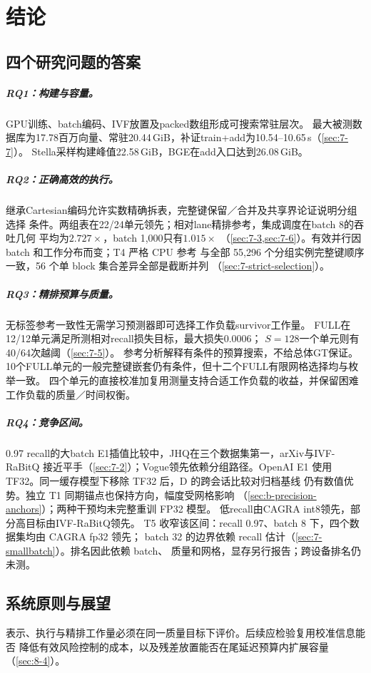\chapter{结论}
\label{ch:conclusion}

\section{四个研究问题的答案}
\label{sec:9-1}
\paragraph{RQ1：构建与容量。}
GPU训练、batch编码、IVF放置及packed数组形成可搜索常驻层次。
最大被测数据库为17.78百万向量、常驻20.44\,GiB，补证train+add为10.54--10.65\,s（\cref{sec:7-7}）。
Stella采样构建峰值22.58\,GiB，BGE在add入口达到26.08\,GiB。

\paragraph{RQ2：正确高效的执行。}
继承Cartesian编码允许实数精确拆表，完整键保留／合并及共享界论证说明分组选择
条件。两组表在22/24单元领先；相对lane精排参考，集成调度在batch 8的吞吐几何
平均为$2.727\times$，batch 1,000只有$1.015\times$
（\cref{sec:7-3,sec:7-6}）。有效并行因 batch 和工作分布而变；T4 严格 CPU 参考
与全部 55,296 个分组实例完整键顺序一致，56 个单 block 集合差异全部是截断并列
（\cref{sec:7-strict-selection}）。

\paragraph{RQ3：精排预算与质量。}
无标签参考一致性无需学习预测器即可选择工作负载survivor工作量。
FULL在12/12单元满足所测相对recall损失目标，最大损失0.0006；
$S=128$一个单元则有40/64次越阈（\cref{sec:7-5}）。
参考分析解释有条件的预算搜索，不给总体GT保证。
10个FULL单元的一般完整键嵌套仍有条件，但十二个FULL有限网格选择均与枚举一致。
四个单元的直接校准加复用测量支持合适工作负载的收益，并保留困难工作负载的质量／时间权衡。

\paragraph{RQ4：竞争区间。}
0.97 recall的大batch E1插值比较中，JHQ在三个数据集第一，arXiv与IVF-RaBitQ
接近平手（\cref{sec:7-2}）；Vogue领先依赖分组路径。OpenAI E1 使用 TF32。同一缓存模型下移除 TF32 后，D 的跨会话比较对归档基线
仍有数值优势。独立 T1 同期锚点也保持方向，幅度受网格影响
（\cref{sec:b-precision-anchors}）；两种干预均未完整重训 FP32 模型。
低recall由CAGRA int8领先，部分高目标由IVF-RaBitQ领先。
T5 收窄该区间：recall 0.97、batch 8 下，四个数据集均由 CAGRA fp32 领先；
batch 32 的边界依赖 recall 估计（\cref{sec:7-smallbatch}）。排名因此依赖 batch、
质量和网格，显存另行报告；跨设备排名仍未测。

\section{系统原则与展望}
\label{sec:9-2}
表示、执行与精排工作量必须在同一质量目标下评价。后续应检验复用校准信息能否
降低有效风险控制的成本，以及残差放置能否在尾延迟预算内扩展容量（\cref{sec:8-4}）。
